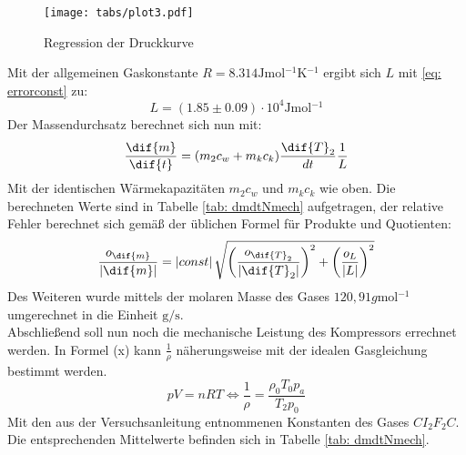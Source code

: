 \begin{figure}
  \centering
  \texttt{[image: tabs/plot3.pdf]}
  \caption{Regression der Druckkurve}
  \label{fig: plot3}
\end{figure}

Mit der allgemeinen Gaskonstante $R = 8.314\si{\joule \mol^{-1} \kelvin^{-1}}$ ergibt sich $L$  mit \eqref{eq: errorconst} zu: %
\begin{equation}
  L = (1.85 \pm 0.09)\cdot 10^{4} \si{\joule \mol^{-1}} %
\end{equation}
Der Massendurchsatz berechnet sich nun mit:
\begin{equation}
  \frac{\dif{m}}{\dif{t}} = (m_2 c_w + m_k c_k)\frac{\dif{T}_2}{dt} \frac{1}{L}
\end{equation}
Mit der identischen Wärmekapazitäten $m_2 c_w$ und $m_k c_k$ wie oben. Die berechneten Werte sind in Tabelle \ref{tab: dmdtNmech} aufgetragen, der relative Fehler berechnet sich gemäß der üblichen Formel
für Produkte und Quotienten:
\begin{equation}
  \frac{o_{\dif{m}}}{\left| \dif{m} \right|} = \left| const \right| \sqrt{\left(\frac{o_{\dif{T}_2}}{\left| \dif{T}_2 \right|}\right)^2 + \left(\frac{o_{L}}{\left| L \right|}\right)^2} %
\end{equation}
Des Weiteren wurde mittels der molaren Masse des Gases $120,91 \si{g \mol ^{-1}}$ \cite{demtröder} umgerechnet in die Einheit $\si{\gram \per \second}$. \\%
Abschließend soll nun noch die mechanische Leistung des Kompressors errechnet werden. In Formel (x) kann $\frac{1}{\rho}$
näherungsweise mit der idealen Gasgleichung bestimmt werden.
\begin{equation}
  pV = nRT \Leftrightarrow  \frac{1}{\rho} = \frac{\rho_0 T_0 p_a}{T_2 p_0}
\end{equation}
Mit den aus der Versuchsanleitung \cite{anleitung206} entnommenen Konstanten des Gases $CI_2F_2C$. Die entsprechenden Mittelwerte befinden sich in Tabelle \ref{tab: dmdtNmech}.






